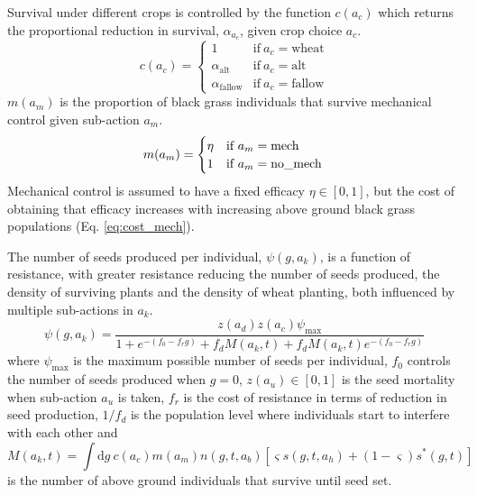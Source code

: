 \documentclass[12pt, a4paper]{article}
\begin{document}
Survival under different crops is controlled by the function $c(a_c)$ which returns the proportional reduction in survival, $\alpha_{a_c}$, given crop choice $a_c$.
\begin{equation}
	c(a_c) = \begin{cases}
		1 &\text{if}~a_c = \text{wheat}\\
		\alpha_\text{alt} &\text{if}~a_c = \text{alt}\\
		\alpha_\text{fallow} &\text{if}~a_c = \text{fallow}
	\end{cases} 
\end{equation} 
$m(a_m)$ is the proportion of black grass individuals that survive mechanical control given sub-action $a_m$.
\begin{equation}
	m(a_m) = \begin{cases}
		\eta &\text{if}~a_m = \text{mech}\\
		1 &\text{if}~a_m = \text{no\_mech}
	\end{cases}\\
\end{equation}
Mechanical control is assumed to have a fixed efficacy $\eta \in [0, 1]$, but the cost of obtaining that efficacy increases with increasing above ground black grass populations (Eq. \ref{eq:cost_mech}).

The number of seeds produced per individual, $\psi(g, a_k)$, is a function of resistance, with greater resistance reducing the number of seeds produced, the density of surviving plants and the density of wheat planting, both influenced by multiple sub-actions in $a_k$. 
\begin{equation}\label{eq:seed_production}
	\psi(g, a_k) = \frac{z(a_d)z(a_c)\psi_\text{max}}{1 + e^{-(f_0 - f_rg)} + f_d M(a_k, t) + f_dM(a_k, t) e^{-(f_0 - f_rg)}}
\end{equation}  
where $\psi_\text{max}$ is the maximum possible number of seeds per individual, $f_0$ controls the number of seeds produced when $g = 0$, $z(a_u) \in [0, 1]$ is the seed mortality when sub-action $a_u$ is taken, $f_r$ is the cost of resistance in terms of reduction in seed production, $1/f_d$ is the population level where individuals start to interfere with each other and 
\begin{equation}\label{eq:num_ind}
	M(a_k, t) = \int \text{d}g~c(a_c)m(a_m)n(g, t, a_b)\left[\varsigma s(g,t,a_h) + (1 - \varsigma)s^*(g, t)\right]   
\end{equation}
is the number of above ground individuals that survive until seed set.
\end{document}
